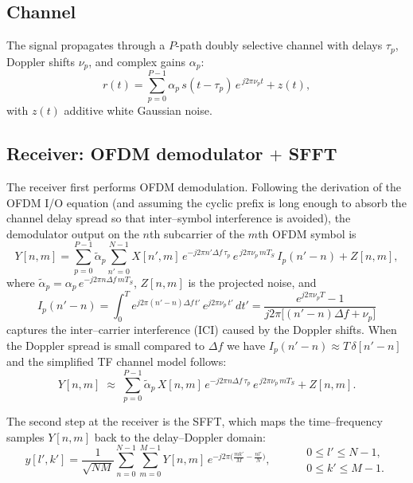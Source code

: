 \documentclass[11pt]{article}
\begin{document}
\subsection*{Channel}

The signal propagates through a \(P\)-path doubly selective channel with
delays \(\tau_p\), Doppler shifts \(\nu_p\), and complex gains \(\alpha_p\):
\begin{equation}
    r(t) = \sum_{p=0}^{P-1}\alpha_p\, s(t-\tau_p)\, e^{\,j2\pi \nu_p t} + z(t),
\end{equation}
with \(z(t)\) additive white Gaussian noise.

\subsection*{Receiver: OFDM demodulator \(+\) SFFT}

The receiver first performs OFDM demodulation. Following the derivation of
the OFDM I/O equation (and assuming the cyclic prefix is long enough to
absorb the channel delay spread so that inter--symbol interference is
avoided), the demodulator output on the \(n\)th subcarrier of the \(m\)th
OFDM symbol is
\begin{equation}
    Y[n,m] = \sum_{p=0}^{P-1} \tilde{\alpha}_p
             \sum_{n'=0}^{N-1} X[n',m]\,
             e^{-j2\pi n'\Delta f\, \tau_p}\,
             e^{\,j2\pi \nu_p\, mT_S}\,
             I_p(n'-n) + Z[n,m],
\label{eq:Y_general}
\end{equation}
where \(\tilde{\alpha}_p = \alpha_p\, e^{-j2\pi n\Delta f\, mT_S}\),
\(Z[n,m]\) is the projected noise, and
\begin{equation}
    I_p(n'-n) = \int_0^T e^{j2\pi(n'-n)\Delta f\, t'}\,
                e^{j2\pi \nu_p\, t'}\, dt'
              = \frac{e^{j2\pi \nu_p T} - 1}
                     {j2\pi\bigl[(n'-n)\Delta f + \nu_p\bigr]}
\end{equation}
captures the inter--carrier interference (ICI) caused by the Doppler shifts.
When the Doppler spread is small compared to \(\Delta f\) we have
\(I_p(n'-n) \approx T\,\delta[n'-n]\) and the simplified TF channel model
follows:
\begin{equation}
    Y[n,m] \;\approx\; \sum_{p=0}^{P-1} \tilde{\alpha}_p\, X[n,m]\,
                       e^{-j2\pi n\Delta f\, \tau_p}\,
                       e^{\,j2\pi \nu_p\, mT_S} + Z[n,m].
\label{eq:Y_simplified}
\end{equation}

The second step at the receiver is the SFFT, which maps the
time--frequency samples \(Y[n,m]\) back to the delay--Doppler domain:
\begin{equation}
    y[l',k'] = \frac{1}{\sqrt{NM}}
               \sum_{n=0}^{N-1}\sum_{m=0}^{M-1} Y[n,m]\,
               e^{-j2\pi\bigl(\tfrac{mk'}{M} - \tfrac{nl'}{N}\bigr)},
    \qquad
    \begin{aligned}
    &0 \leq l' \leq N-1, \\
    &0 \leq k' \leq M-1.
    \end{aligned}
\end{equation}
\end{document}
